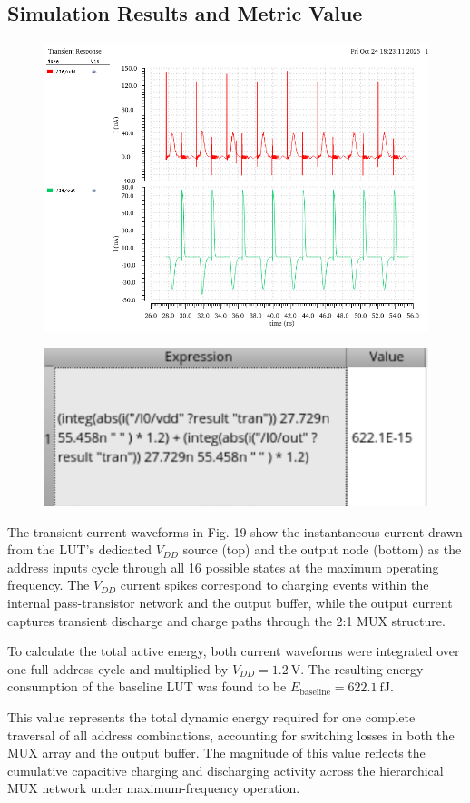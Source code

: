 \documentclass[12pt]{article}
\begin{document}
\newpage

\subsection{Simulation Results and Metric Value}
\begin{figure}[H]
    \centering
    \includegraphics[width=0.7\linewidth]{writeup//figures/baseline_energy_currents.png}
    \caption{}
\end{figure}

\begin{figure}[H]
    \centering
    \includegraphics[width=0.4\linewidth]{writeup//figures/baseline_energy_val.png}
    \caption{}
\end{figure}

The transient current waveforms in Fig. 19 show the instantaneous current drawn from the LUT’s dedicated $V_{DD}$ source (top) and the output node (bottom) as the address inputs cycle through all 16 possible states at the maximum operating frequency. The $V_{DD}$ current spikes correspond to charging events within the internal pass-transistor network and the output buffer, while the output current captures transient discharge and charge paths through the 2:1 MUX structure.  

To calculate the total active energy, both current waveforms were integrated over one full address cycle and multiplied by $V_{DD} = 1.2~\text{V}$. The resulting energy consumption of the baseline LUT was found to be $\boxed{E_{\text{baseline}} = 622.1~\text{fJ}}$.

This value represents the total dynamic energy required for one complete traversal of all address combinations, accounting for switching losses in both the MUX array and the output buffer. The magnitude of this value reflects the cumulative capacitive charging and discharging activity across the hierarchical MUX network under maximum-frequency operation.
\end{document}

